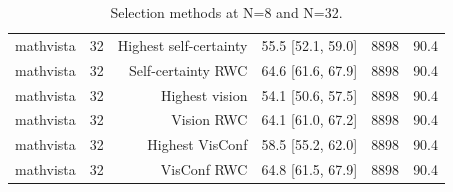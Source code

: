 \begin{table}[t]
\begin{tabular}{lrrrrr}
mathvista & 32 & Highest self-certainty & 55.5 [52.1, 59.0] & 8898 & 90.4 \\
mathvista & 32 & Self-certainty RWC & 64.6 [61.6, 67.9] & 8898 & 90.4 \\
mathvista & 32 & Highest vision & 54.1 [50.6, 57.5] & 8898 & 90.4 \\
mathvista & 32 & Vision RWC & 64.1 [61.0, 67.2] & 8898 & 90.4 \\
mathvista & 32 & Highest VisConf & 58.5 [55.2, 62.0] & 8898 & 90.4 \\
mathvista & 32 & VisConf RWC & 64.8 [61.5, 67.9] & 8898 & 90.4 \\
\bottomrule
\end{tabular}
\caption{Selection methods at N=8 and N=32.}
\label{tab:task3_methods}
\end{table}
